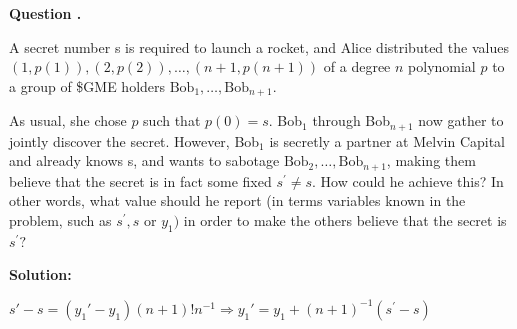 \documentclass[12pt]{article}
\newcounter{questionnumber}
\newenvironment{question}[1][]{\stepcounter{questionnumber}\par\noindent\textbf{Question \thequestionnumber. #1}\par}{\par}
\newenvironment{solution}{\par\noindent\textbf{Solution:}\par}{\par\vspace{1em}}
\begin{document}
\begin{question}
    A secret number s is required to launch a rocket, and Alice distributed the values
    $(1,p(1)),(2,p(2)),\ldots,(n+1,p(n+1))$ of a degree $n$ polynomial $p$ to a group of \$GME holders $\text{Bob}_1,\ldots,\text{Bob}_{n+1}.$

    As usual, she chose $p$ such that $p(0)=s.$ Bob$_1$ through Bob$_{n+1}$ now gather to jointly discover the secret. However, Bob$_1$ is secretly a partner at Melvin Capital and already knows s, and wants to sabotage $\mathrm{Bob}_2,\ldots,\mathrm{Bob}_{n+1}$, making them believe that the secret is in fact some fixed $s^\prime\neq s.$ How could he achieve this? In other words, what value should he report (in terms variables known in the problem, such as $s^\prime,s$ or $y_1)$ in order to make the others believe that the secret is $s^\prime?$
\end{question}
\begin{solution}
    $s\prime -s=\left( y_1\prime -y_1 \right) \left( n+1 \right) !n^{-1}\Longrightarrow y_1\prime =y_1+\left( n+1 \right) ^{-1}\left( s^{\prime}-s \right) $
\end{solution}
\end{document}
